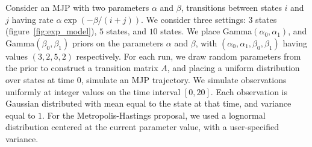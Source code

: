 \noindent Consider an MJP with two parameters $\alpha$ and $\beta$, 
transitions between states $i$ and $j$ having rate $\alpha \exp(-\beta/(i+j))$.
We consider three settings: $3$ states (figure~\ref{fig:exp_model}),
$5$ states, and $10$ states.
We place Gamma$(\alpha_0,\alpha_1)$, and Gamma$(\beta_0, \beta_1)$ priors on 
the parameters $\alpha$ and $\beta$, with $(\alpha_0,\alpha_1,\beta_0,\beta_1)$ 
having values $(3,2,5,2)$ respectively. For each run, we draw random parameters 
from the prior to construct a transition matrix $A$, and placing a uniform 
distribution over states at time $0$, simulate an MJP trajectory.
We simulate observations uniformly at integer values on the time interval 
$[0, 20]$. Each observation is Gaussian distributed with mean equal to the state
at that time, and variance equal to $1$.  For the Metropolis-Hastings proposal, 
we used a lognormal distribution centered at the current parameter value, with 
a user-specified variance.

